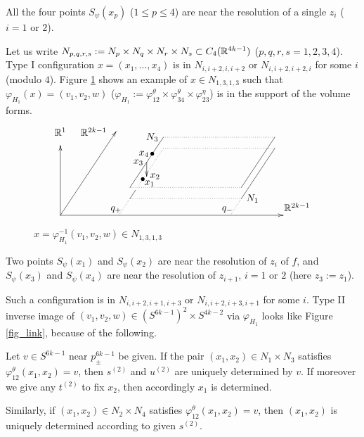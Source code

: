 All the four points $S_{\psi}(x_p )$ ($1\le p\le 4$) are near the resolution of a single $z_i$ ($i=1$ or $2$).


Let us write $N_{p,q,r,s}:=N_p \times N_q \times N_r \times N_s \subset C_4 (\mathbb{R}^{4k-1})$ ($p,q,r,s=1,2,3,4$).
Type I configuration $x=(x_1 ,\dots ,x_4 )$ is in $N_{i, i+2,i,i+2}$ or $N_{i,i+2,i+2,i}$ for some $i$ (modulo $4$).
Figure \ref{fig_unlink} shows an example of $x \in N_{1,3,1,3}$ such that $\varphi_{H_1}(x) =(v_1 ,v_2 ,w)$
($\varphi_{H_1}:=\varphi^{\theta}_{12}\times \varphi^{\theta}_{34}\times \varphi^{\eta}_{23}$) is in the support of
the volume forms.


\begin{figure}[htb]%
\[
 \begin{xy}
 {\ar (0,0);(80,0)},{\ar (0,0);(20,30)},{\ar (0,0);(0,25)}, (0,30)*{\R^1},(12,30)*{\R^{2k-1}},(85,3)*{\R^{2k-1}},
 {\ar@{-}(25,10);(37,28)},{\ar@{-}(65,10);(77,28)},{\ar@{.}(25,10);(65,10)},{\ar@{.}(37,28);(77,28)},
 {\ar@{-}(25,6);(27,9)},{\ar@{.}(28,10.5);(37,24)},{\ar@{-}(65,6);(77,24)}, {\ar@{.}(25,6);(65,6)},
  {\ar@{.}(37,24);(77,24)},
 (33,28)*{N_3},(69,6)*{N_1},
 (33,22)*{\bullet},(29.6,12.9)*{\bullet},(30,22)*{x_4},(28,19)*{x_3},(34,14)*{x_2},(32,11.4)*{x_1},
 {\ar (31,19);(31,14)},
 {\ar@{.}(21,0);(25,6)},{\ar@{.}(61,0);(65,6)},
 (20,2)*{q_+},(60,2)*{q_-}
 \end{xy}
\]
\caption{$x=\varphi^{-1}_{H_1}(v_1 ,v_2 ,w)\in N_{1,3,1,3}$}\label{fig_unlink}
\end{figure}


Two points $S_{\psi}(x_1 )$ and $S_{\psi}(x_2 )$ are near the resolution of $z_i$ of $f$, and
$S_{\psi}(x_3 )$ and $S_{\psi}(x_4 )$ are near the resolution of $z_{i+1}$, $i=1$ or $2$ (here $z_3 :=z_1$).


Such a configuration is in $N_{i,i+2,i+1,i+3}$ or $N_{i,i+2,i+3,i+1}$ for some $i$.
Type II inverse image of $(v_1 ,v_2 ,w) \in (S^{6k-1})^2 \times S^{4k-2}$ via $\varphi_{H_1}$ looks like
Figure \ref{fig_link}, because of the following.


\begin{lem}\label{lem_local_N2}
Let $v \in S^{6k-1}$ near $p^{6k-1}_{\pm}$ be given.
If the pair $(x_1 ,x_2 ) \in N_1 \times N_3$ satisfies $\varphi^{\theta}_{12}(x_1 ,x_2 )=v$, then $s^{(2)}$ and
$u^{(2)}$ are uniquely determined by $v$.
If moreover we give any $t^{(2)}$ to fix $x_2$, then accordingly $x_1$ is determined.


Similarly, if $(x_1 ,x_2 ) \in N_2 \times N_4$ satisfies $\varphi^{\theta}_{12}(x_1 ,x_2 )=v$, then
$(x_1 ,x_2 )$ is uniquely determined according to given $s^{(2)}$.
\end{lem}


